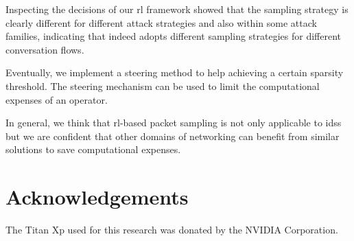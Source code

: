 \documentclass[conference]{IEEEtran}
\begin{document}
Inspecting the decisions of our \gls{rl} framework showed that the sampling strategy is clearly different for different attack strategies and also within some attack families, indicating that \ours{} indeed adopts different sampling strategies for different conversation flows.

Eventually, we implement a steering method to help achieving a certain sparsity threshold. The steering mechanism can be used to limit the computational expenses of an operator.

In general, we think that \gls{rl}-based packet sampling is not only applicable to \glspl{ids} but we are confident that other domains of networking can benefit from similar solutions to save computational expenses.

\section*{Acknowledgements}
The Titan Xp used for this research was donated by the NVIDIA Corporation.

\renewcommand*{\bibfont}{\small}


\end{document}
